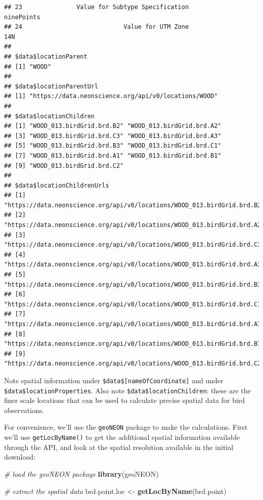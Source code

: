 \documentclass[]{book}
\newenvironment{Shaded}{\begin{snugshade}}{\end{snugshade}}
\newcommand{\CommentTok}[1]{\textcolor[rgb]{0.56,0.35,0.01}{\textit{#1}}}
\newcommand{\KeywordTok}[1]{\textcolor[rgb]{0.13,0.29,0.53}{\textbf{#1}}}
\newcommand{\NormalTok}[1]{#1}
\newcommand{\StringTok}[1]{\textcolor[rgb]{0.31,0.60,0.02}{#1}}
\begin{document}
\begin{verbatim}
## 23               Value for Subtype Specification            ninePoints
## 24                            Value for UTM Zone                   14N
## 
## $data$locationParent
## [1] "WOOD"
## 
## $data$locationParentUrl
## [1] "https://data.neonscience.org/api/v0/locations/WOOD"
## 
## $data$locationChildren
## [1] "WOOD_013.birdGrid.brd.B2" "WOOD_013.birdGrid.brd.A2"
## [3] "WOOD_013.birdGrid.brd.C3" "WOOD_013.birdGrid.brd.A3"
## [5] "WOOD_013.birdGrid.brd.B3" "WOOD_013.birdGrid.brd.C1"
## [7] "WOOD_013.birdGrid.brd.A1" "WOOD_013.birdGrid.brd.B1"
## [9] "WOOD_013.birdGrid.brd.C2"
## 
## $data$locationChildrenUrls
## [1] "https://data.neonscience.org/api/v0/locations/WOOD_013.birdGrid.brd.B2"
## [2] "https://data.neonscience.org/api/v0/locations/WOOD_013.birdGrid.brd.A2"
## [3] "https://data.neonscience.org/api/v0/locations/WOOD_013.birdGrid.brd.C3"
## [4] "https://data.neonscience.org/api/v0/locations/WOOD_013.birdGrid.brd.A3"
## [5] "https://data.neonscience.org/api/v0/locations/WOOD_013.birdGrid.brd.B3"
## [6] "https://data.neonscience.org/api/v0/locations/WOOD_013.birdGrid.brd.C1"
## [7] "https://data.neonscience.org/api/v0/locations/WOOD_013.birdGrid.brd.A1"
## [8] "https://data.neonscience.org/api/v0/locations/WOOD_013.birdGrid.brd.B1"
## [9] "https://data.neonscience.org/api/v0/locations/WOOD_013.birdGrid.brd.C2"
\end{verbatim}

Note spatial information under \texttt{\$data\${[}nameOfCoordinate{]}} and under
\texttt{\$data\$locationProperties}. Also note \texttt{\$data\$locationChildren}: these are the
finer scale locations that can be used to calculate precise spatial data for
bird observations.

For convenience, we'll use the \texttt{geoNEON} package to make the calculations.
First we'll use \texttt{getLocByName()} to get the additional spatial information
available through the API, and look at the spatial resolution available in the
initial download:

\begin{Shaded}
\begin{Highlighting}[]
\CommentTok{# load the geoNEON package}
\KeywordTok{library}\NormalTok{(geoNEON)}

\CommentTok{# extract the spatial data}
\NormalTok{brd.point.loc <-}\StringTok{ }\KeywordTok{getLocByName}\NormalTok{(brd.point)}
\end{Highlighting}
\end{Shaded}
\end{document}
